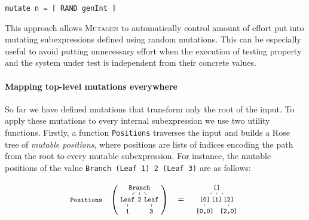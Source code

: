 \documentclass[sigconf,review,anonymous]{acmart}
\newcommand{\mutagen}{\textsc{Mutagen}\xspace}
\begin{document}
\begin{verbatim}
mutate n = [ RAND genInt ]
\end{verbatim}

This approach allows \mutagen to automatically control amount of effort put into
mutating subexpressions defined using random mutations.
%
This can be especially useful to avoid putting unnecessary effort when the
execution of testing property and the system under test is independent from
their concrete values. 


\paragraph{Mapping top-level mutations everywhere}

So far we have defined mutations that transform only the root of the input.
%
To apply these mutations to every internal subexpression we use two utility
functions.
%
Firstly, a function \texttt{Positions} traverses the input and builds a Rose
tree\cite{meertens1988first} of \emph{mutable positions}, where positions are
lists of indices encoding the path from the root to every mutable subexpression.
%
%
%
%
For instance, the mutable positions of the value \texttt{Branch (Leaf 1) 2
  (Leaf 3)} are as follows:

\vspace{-5pt}
\begin{equation}
  \nonumber
  \footnotesize
  \texttt{Positions}\quad
  \left(
  \tikz[
    baseline=-6mm,
    level distance=0.5cm,
    level 1/.style={sibling distance=0.5cm},
    level 2/.style={sibling distance=0.5cm}
  ]{
    \node {\texttt{Branch}}
      child {node {\texttt{Leaf}}
        child {node {\texttt{1}}}
      }
      child {node {\texttt{2}}}
      child {node {\texttt{Leaf}}
        child {node {\texttt{3}}}
      };
  }
  \right)
  \quad
  =
  \quad
  \tikz[
    baseline=-6mm,
    level distance=0.5cm,
    level 1/.style={sibling distance=0.5cm},
    level 2/.style={sibling distance=0.5cm}
  ]{
    \node {\texttt{[]}}
      child {node {\texttt{[0]}}
        child {node {\texttt{[0,0]}}}
      }
      child {node {\texttt{[1]}}}
      child {node {\texttt{[2]}}
        child {node {\texttt{[2,0]}}}
      };
  }
\end{equation}
\vspace{-5pt}
\end{document}
